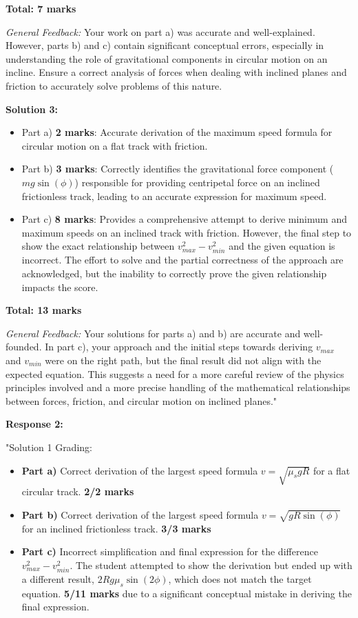 \documentclass[a4paper,11pt]{article}
\begin{document}
\textbf{Total: 7 marks}

\textit{General Feedback:} Your work on part a) was accurate and well-explained. However, parts b) and c) contain significant conceptual errors, especially in understanding the role of gravitational components in circular motion on an incline. Ensure a correct analysis of forces when dealing with inclined planes and friction to accurately solve problems of this nature.

\textbf{Solution 3:}
\begin{itemize}
    \item Part a) \textbf{2 marks}: Accurate derivation of the maximum speed formula for circular motion on a flat track with friction.
    \item Part b) \textbf{3 marks}: Correctly identifies the gravitational force component (\(mg\sin(\phi)\)) responsible for providing centripetal force on an inclined frictionless track, leading to an accurate expression for maximum speed.
    \item Part c) \textbf{8 marks}: Provides a comprehensive attempt to derive minimum and maximum speeds on an inclined track with friction. However, the final step to show the exact relationship between \(v_{max}^2 - v_{min}^2\) and the given equation is incorrect. The effort to solve and the partial correctness of the approach are acknowledged, but the inability to correctly prove the given relationship impacts the score.
\end{itemize}

\textbf{Total: 13 marks}

\textit{General Feedback:} Your solutions for parts a) and b) are accurate and well-founded. In part c), your approach and the initial steps towards deriving \(v_{max}\) and \(v_{min}\) were on the right path, but the final result did not align with the expected equation. This suggests a need for a more careful review of the physics principles involved and a more precise handling of the mathematical relationships between forces, friction, and circular motion on inclined planes."

\textbf{Response 2:}

"Solution 1 Grading:

\begin{itemize}
    \item \textbf{Part a)} Correct derivation of the largest speed formula \(v = \sqrt{\mu_s g R}\) for a flat circular track. \textbf{2/2 marks}
    \item \textbf{Part b)} Correct derivation of the largest speed formula \(v = \sqrt{gR\sin(\phi)}\) for an inclined frictionless track. \textbf{3/3 marks}
    \item \textbf{Part c)} Incorrect simplification and final expression for the difference \(v_{max}^2 - v_{min}^2\). The student attempted to show the derivation but ended up with a different result, \(2Rg\mu_s\sin(2\phi)\), which does not match the target equation. \textbf{5/11 marks} due to a significant conceptual mistake in deriving the final expression.
\end{itemize}
\end{document}
